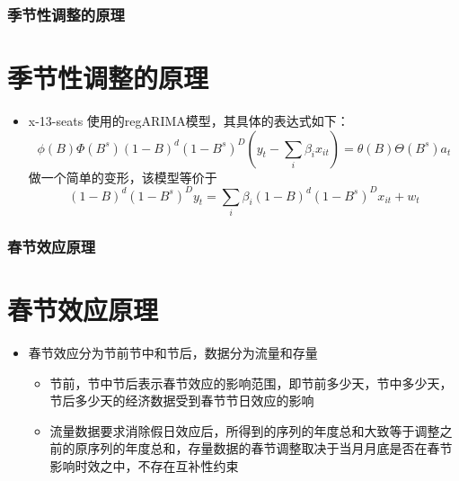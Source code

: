 \documentclass{beamer}
\begin{document}
\begin{frame}
\frametitle{季节性调整的原理}
\section{季节性调整的原理}
\begin{itemize}
\item x-13-seats 使用的regARIMA模型，其具体的表达式如下：
\[\phi(B)\Phi(B^{s})(1-B)^{d}(1-B^{s})^{D}(y_{t}-\sum_{i}\beta_{i}x_{it})=\theta(B)\Theta(B^{s})a_{t}\]
做一个简单的变形，该模型等价于
\[(1-B)^{d}(1-B^{s})^{D}y_{t}=\sum_{i}\beta_{i}(1-B)^{d}(1-B^{s})^{D}x_{it}+w_{t}\]
\end{itemize}
\end{frame}


\begin{frame}
\frametitle{春节效应原理}
\section{春节效应原理}
\begin{itemize}
\item 春节效应分为节前节中和节后，数据分为流量和存量
\vskip 10pt
\begin{itemize}
\item 节前，节中节后表示春节效应的影响范围，即节前多少天，节中多少天，节后多少天的经济数据受到春节节日效应的影响
\vskip 5pt
\item 流量数据要求消除假日效应后，所得到的序列的年度总和大致等于调整之前的原序列的年度总和，存量数据的春节调整取决于当月月底是否在春节影响时效之中，不存在互补性约束
\end{itemize}
\end{itemize}
\end{frame}
\end{document}
